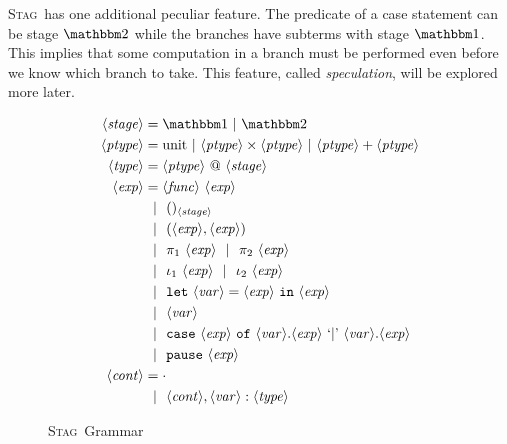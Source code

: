 \documentclass[11pt]{article}
\makeatletter
\newcommand {\stage} {\langle\mathit{stage}\rangle}
\newcommand {\ptype} {\langle\mathit{ptype}\rangle}
\newcommand {\type} {\langle\mathit{type}\rangle}
\newcommand {\expr} {\langle\mathit{exp}\rangle}
\newcommand {\var} {\langle\mathit{var}\rangle}
\newcommand {\context} {\langle\mathit{cont}\rangle}
\newcommand {\gbar} {~~|~~}
\newcommand {\bbone} {\mathbbm 1}
\newcommand {\bbtwo} {\mathbbm 2}
\newcommand {\at} {{\tt~@~}}
\newcommand {\pause} {{\tt pause}}
\newcommand {\letin} [3] {{\tt let}~{#1} = {#2}~{\tt in}~{#3}}
\newcommand {\wstage} {\textsc{Stag}}
\makeatother
\begin{document}
\wstage~has one additional peculiar feature.  The predicate of a case statement can be stage $\bbtwo$ while the branches have subterms with stage $\bbone$.  This implies that some computation in a branch must be performed even before we know which branch to take.  This feature, called {\it speculation}, will be explored more later.

\begin{figure}
\caption{\wstage~Grammar}
\label{fig:gram}
\centering
\begin{align*}
\stage &= \bbone~|~\bbtwo \\
\ptype &= \text{unit}~|~\ptype \times \ptype~|~\ptype + \ptype \\
\type &= \ptype \at \stage \\
\expr &= \langle\mathit{func}\rangle~\expr \\
&\gbar ()_{\stage} \\
&\gbar (\expr, \expr) \\
&\gbar \pi_1~\expr \gbar \pi_2~\expr \\
&\gbar \iota_1~\expr \gbar \iota_2~\expr \\
&\gbar \letin {\var}{\expr}{\expr} \\
&\gbar \var \\
&\gbar {\tt case}~\expr~{\tt of}~\var.\expr~`{\tt |}\text{'}~\var.\expr \\
&\gbar \pause~\expr \\
\context &= \cdot \\
&\gbar \context, \var : \type
\end{align*}
\end{figure}
\end{document}
